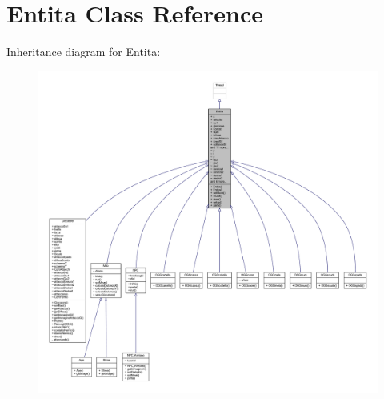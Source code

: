 \hypertarget{class_entita_1_1_entita}{}\section{Entita Class Reference}
\label{class_entita_1_1_entita}


Inheritance diagram for Entita\+:
\nopagebreak
\begin{figure}[H]
\begin{center}
\leavevmode
\includegraphics[width=350pt]{class_entita_1_1_entita__inherit__graph}
\end{center}
\end{figure}


